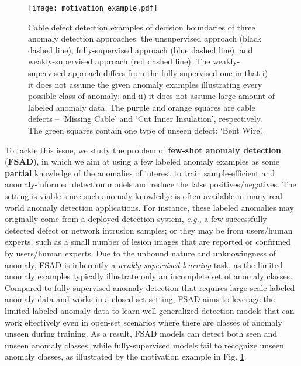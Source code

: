 \documentclass[10pt,journal,compsoc]{IEEEtran}
\newcommand{\eg}{\textit{e.g.}}
\begin{document}
\begin{figure}[t!]
  \centering
    \texttt{[image: motivation\_example.pdf]}
  \caption{Cable defect detection examples of decision boundaries of three anomaly detection approaches: the unsupervised approach (black dashed line), fully-supervised approach (blue dashed line), and weakly-supervised approach (red dashed line). The weakly-supervised approach differs from the fully-supervised one in that i) it does not assume the given anomaly examples illustrating every possible class of anomaly; and ii) it does not assume large amount of labeled anomaly data. The purple and orange squares are cable defects -- `Missing Cable' and `Cut Inner Insulation', respectively. The green squares contain one type of unseen defect: `Bent Wire'.}
  \label{fig:motivationexample}
\end{figure}


To tackle this issue, we study the problem of \textbf{few-shot anomaly detection} (\textbf{FSAD}), in which we aim at 
using 
a few labeled anomaly examples as some \textbf{partial} knowledge of the anomalies of interest to train sample-efficient and anomaly-informed detection models and reduce the false positives/negatives. The setting is viable since such anomaly knowledge is often available in many real-world anomaly detection applications. For instance, these labeled anomalies may originally come from a deployed detection system, \eg, a few successfully detected defect or network intrusion samples; or they may be from users/human experts, such as a small number of lesion images that are reported or confirmed by users/human experts. Due to the unbound nature and unknowingness of anomaly, FSAD is inherently a \textit{weakly-supervised learning} \cite{zhou2018brief} task, as the limited anomaly examples typically illustrate only an incomplete set of anomaly classes. Compared to fully-supervised anomaly detection that requires large-scale labeled anomaly data and works in a closed-set setting, FSAD aims to leverage the limited labeled anomaly data to learn well generalized detection models that can work effectively even in open-set scenarios where there are classes of anomaly unseen during training. As a result, FSAD models can detect both seen and unseen anomaly classes, while fully-supervised models fail to recognize unseen anomaly classes, as illustrated by the motivation example in Fig. \ref{fig:motivationexample}.
\end{document}
